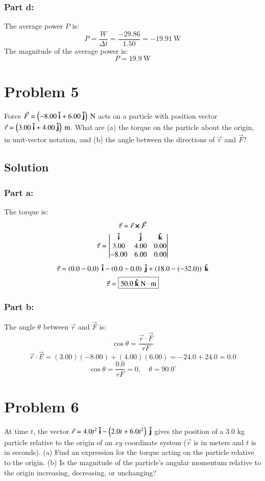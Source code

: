 \documentclass{article}
\begin{document}
\subsubsection*{Part d:}
The average power $P$ is:
\[
P = \frac{W}{\Delta t} = \frac{-29.86}{1.50} = -19.91\ \text{W}
\]
The magnitude of the average power is:
\[
P = \boxed{19.9\ \text{W}}
\]

\section*{Problem 5}
Force $\vec F = \left( -8.00\ \vu i + 6.00\ \vu j \right)\ \text{N}$ acts on a particle with position vector $\vec r = \left( 3.00\ \vu i + 4.00\ \vu j \right)\ \text{m}$. What are (a) the torque on the particle about the origin, in unit-vector notation, and (b) the angle between the directions of $\vec r$ and $\vec F$?

\subsection*{Solution}
\subsubsection*{Part a:}
The torque is:
\[
\vec \tau = \vec r \cross \vec F
\]
\[
\vec \tau = \begin{vmatrix}
\vu i & \vu j & \vu k \\
3.00 & 4.00 & 0.00 \\
-8.00 & 6.00 & 0.00
\end{vmatrix}
\]
\[
\vec \tau = \left(0.0 - 0.0\right)\ \vu i - \left(0.0 - 0.0\right)\ \vu j + \left(18.0 - (-32.0)\right)\ \vu k
\]
\[
\vec \tau = \boxed{50.0\ \vu k\ \text{N}\cdot\text{m}}
\]

\subsubsection*{Part b:}
The angle $\theta$ between $\vec r$ and $\vec F$ is:
\[
\cos \theta = \frac{\vec r \cdot \vec F}{r F}
\]
\[
\vec r \cdot \vec F = (3.00)(-8.00) + (4.00)(6.00) = -24.0 + 24.0 = 0.0
\]
\[
\cos \theta = \frac{0.0}{r F} = 0,\quad \theta = \boxed{90.0^\circ}
\]


\section*{Problem 6}
At time $t$, the vector $\vec r = 4.0t^2\ \vu i - \left( 2.0t + 6.0t^2\right)\ \vu j$ gives the position of a 3.0 kg particle relative to the origin of an $xy$ coordinate system ($\vec r$ is in meters and $t$ is in seconds). (a) Find an expression for the torque acting on the particle relative to the origin. (b) Is the magnitude of the particle's angular momentum relative to the origin increasing, decreasing, or unchanging?
\end{document}
